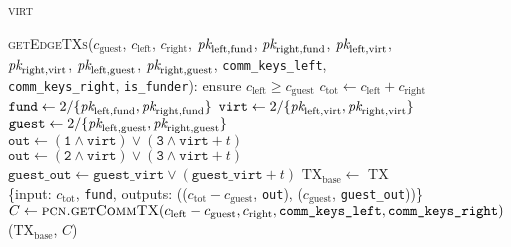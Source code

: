 \begin{figure}[H]
  \begin{processbox}{\textsc{virt}}
    \begin{algorithmic}[1]
      \State {}
      \State \textsc{getEdgeTXs}($c_{\mathrm{guest}}$, $c_{\mathrm{left}}$,
      $c_{\mathrm{right}}$, $\textit{pk}_{\mathrm{left}, \mathrm{fund}}$,
      $\textit{pk}_{\mathrm{right}, \mathrm{fund}}$, $\textit{pk}_{\mathrm{left}, \mathrm{virt}}$,
      $\textit{pk}_{\mathrm{right}, \mathrm{virt}}$, $\textit{pk}_{\mathrm{left},
      \mathrm{guest}}$, $\textit{pk}_{\mathrm{right}, \mathrm{guest}}$,
      \texttt{comm\_keys\_left}, \texttt{comm\_keys\_right},
      \texttt{is\_funder}):
      \Indent
        \State ensure $c_{\mathrm{left}} \geq c_{\mathrm{guest}}$
        \State $c_{\mathrm{tot}} \gets c_{\mathrm{left}} + c_{\mathrm{right}}$
        \State $\texttt{fund} \gets 2/\{\textit{pk}_{\mathrm{left}, \mathrm{fund}},
        \textit{pk}_{\mathrm{right}, \mathrm{fund}}\}$
        \State $\texttt{virt} \gets 2/\{\textit{pk}_{\mathrm{left}, \mathrm{virt}},
        \textit{pk}_{\mathrm{right}, \mathrm{virt}}\}$
        \State $\texttt{guest} \gets 2/\{\textit{pk}_{\mathrm{left}, \mathrm{guest}},
        \textit{pk}_{\mathrm{right}, \mathrm{guest}}\}$
          \State $\texttt{out} \gets (\texttt{1} \wedge \texttt{virt}) \vee
          (\texttt{3} \wedge \texttt{virt} + t)$
        \Else \: 
          \State $\texttt{out} \gets (\texttt{2} \wedge \texttt{virt}) \vee
          (\texttt{3} \wedge \texttt{virt} + t)$
        \EndIf
        \State $\texttt{guest\_out} \gets \texttt{guest\_virt} \vee
        (\texttt{guest\_virt} + t)$
        \State $\mathrm{TX}_{\mathrm{base}} \gets$ TX \{input:
        $c_{\mathrm{tot}}$, \texttt{fund}, outputs: (($c_{\mathrm{tot}} -
        c_{\mathrm{guest}}$, \texttt{out}), ($c_{\mathrm{guest}}$,
        \texttt{guest\_out}))\}
        \State $C \gets \textsc{pcn.getCommTX}(c_{\mathrm{left}} -
        c_{\mathrm{guest}}, c_{\mathrm{right}}, \texttt{comm\_keys\_left},
        \texttt{comm\_keys\_right})$
        \State \Return ($\mathrm{TX}_{\mathrm{base}}$, $C$)
      \EndIndent
    \end{algorithmic}
  \end{processbox}
  \caption{}
  \label{code:virtual-layer:edge-txs}
\end{figure}

